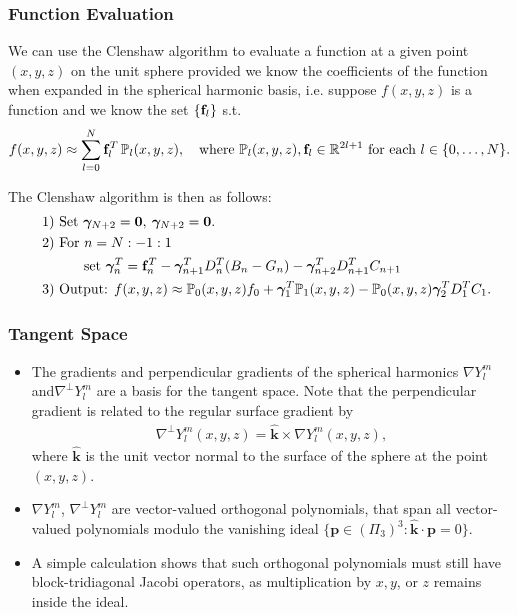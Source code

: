 \documentclass[10pt]{beamer}
\newcommand{\R}{\mathbb{R}}
\newcommand{\bigP}{\mathbb{P}}
\newcommand{\Pl}{\mathbb{P}_l}
\newcommand{\gradYlm}{\nabla Y^m_l}
\newcommand{\gradpYlm}{\nabla^\perp Y^m_l}
\newcommand{\unitvec}{\hat{\bm{k}}}
\begin{document}
\frame
{
    \frametitle{Function Evaluation}
    
We can use the Clenshaw algorithm to evaluate a function at a given point \((x,y,z)\) on the unit sphere provided we know the coefficients of the function when expanded in the spherical harmonic basis, i.e. suppose \(f(x,y,z)\) is a function and we know the set \(\{\bold{f}_l\}\) s.t.
\begin{align}
f(x,y,z) \approx \sum^N_{l=0} \bold{f}_l^T \, \Pl (x,y,z), \quad \text{where } \Pl (x,y,z), \bold{f}_l \in \R^{2l+1} \text{ for each } l \in \{0,\dots,N\}.
\end{align}

The Clenshaw algorithm is then as follows:
\begin{align*}
\quad &\text{1) } \text{Set } \bm{\gamma}_{N+2} = \bold{0}, \: \bm{\gamma}_{N+2} = \bold{0}. \\
\quad &\text{2) } \text{For } n = N:-1:1 \\
\quad & \quad \quad \quad \text{set } \bm{\gamma}_{n}^T = \bold{f}_n^T - \bm{\gamma}_{n+1}^T D^T_n (B_n - G_n) -  \bm{\gamma}_{n+2}^T D^T_{n+1}C_{n+1} \\
\quad &\text{3) } \text{Output: } f(x,y,z) \approx \bigP_0(x,y,z) f_0 + \bm{\gamma}_{1}^T \bigP_1(x,y,z) - \bigP_0(x,y,z) \bm{\gamma}_{2}^T D^T_1 C_1.
\end{align*}

}

\frame
{
    \frametitle{Tangent Space}

\begin{itemize}

\item The gradients and perpendicular gradients of the spherical harmonics \(\gradYlm\) and\(\gradpYlm\) are a basis for the tangent space. Note that the perpendicular gradient is related to the regular surface gradient by
\begin{align}
\gradpYlm(x,y,z) = \unitvec \times \gradYlm(x,y,z),
\end{align}
where \(\unitvec\) is the unit vector normal to the surface of the sphere at the point \((x,y,z)\).

\item \(\gradYlm\), \(\gradpYlm\) are vector-valued orthogonal polynomials, that span all vector-valued polynomials modulo the vanishing ideal $\{ \bm{p} \in (\Pi_3)^3  : \unitvec \cdot \bm{p} = 0 \}$. 

\item A simple calculation shows that such orthogonal polynomials must still have block-tridiagonal Jacobi operators, as multiplication by $x, y$, or $z$ remains inside the ideal. 

\end{itemize}

}
\end{document}
